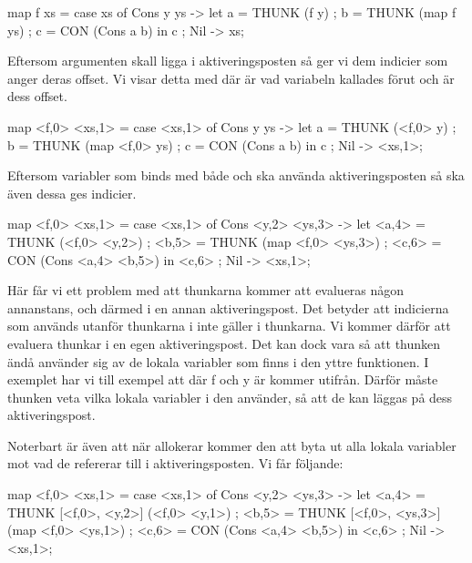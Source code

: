\documentclass[../Core]{subfiles}
\begin{document}

\begin{codeEx}
map f xs = case xs of
    { Cons y ys -> let
        { a = THUNK (f y)
        ; b = THUNK (map f ys)
        ; c = CON (Cons a b)
        } in c
    ; Nil -> xs};
\end{codeEx}

Eftersom argumenten skall ligga i aktiveringsposten så ger vi dem indicier som anger deras 
offset. Vi visar detta med  där  är vad variabeln kallades 
förut och  är dess offset.

\begin{codeEx}
map <f,0> <xs,1> = case <xs,1> of
    { Cons y ys -> let
        { a = THUNK (<f,0> y)
        ; b = THUNK (map <f,0> ys)
        ; c = CON (Cons a b)
        } in c
    ; Nil -> <xs,1>};
\end{codeEx}

Eftersom variabler som binds med både  och  
ska använda aktiveringsposten så ska även dessa ges indicier.

\begin{codeEx}
map <f,0> <xs,1> = case <xs,1> of
    { Cons <y,2> <ys,3> -> let
        { <a,4> = THUNK (<f,0> <y,2>)
        ; <b,5> = THUNK (map <f,0> <ys,3>)
        ; <c,6> = CON (Cons <a,4> <b,5>)
        } in <c,6>
    ; Nil -> <xs,1>};
\end{codeEx}

Här får vi ett problem med att thunkarna kommer att evalueras någon 
annanstans, och därmed i en annan aktiveringspost. Det betyder att indicierna som 
används utanför thunkarna i  inte gäller i thunkarna. Vi kommer därför att evaluera
thunkar i en egen aktiveringspost. Det kan dock vara så att thunken ändå använder sig
av de lokala variabler som finns i den yttre funktionen. I exemplet har vi till exempel att 
 där f och y är kommer utifrån. Därför 
måste thunken veta vilka lokala variabler i  den använder, så att de kan
läggas på dess aktiveringspost. 

Noterbart är även att när  allokerar kommer den att byta ut alla lokala variabler
mot vad de refererar till i aktiveringsposten. Vi får följande: 


\begin{codeEx}
map <f,0> <xs,1> = case <xs,1> of
    { Cons <y,2> <ys,3> -> let
        { <a,4> = THUNK [<f,0>, <y,2>]  (<f,0> <y,1>)
        ; <b,5> = THUNK [<f,0>, <ys,3>] (map <f,0> <ys,1>)
        ; <c,6> = CON (Cons <a,4> <b,5>)
        } in <c,6>
    ; Nil -> <xs,1>};
\end{codeEx}
\end{document}
